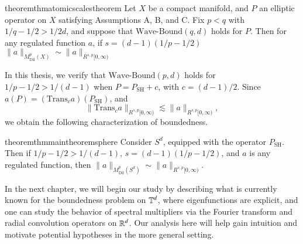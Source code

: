 \begin{restatable}{theorem}{thmatomicscalestheorem} \label{atomicscalestheorem}
  Let $X$ be a compact manifold, and $P$ an elliptic operator on $X$ satisfying Assumptions A, B, and C. Fix $p < q$ with $1/q - 1/2 > 1/2d$, and suppose that $\text{Wave-Bound}(q,d)$ holds for $P$. Then for any regulated function $a$, if $s = (d-1)(1/p - 1/2)$ $\| a \|_{M^p_{\text{Dil}}(X)} \sim \| a \|_{R^{s,p}[0,\infty)}$
\end{restatable}

In this thesis, we verify that $\text{Wave-Bound}(p,d)$ holds for $1/p - 1/2 > 1/(d-1)$ when $P = P_{\text{SH}} + c$, with $c = (d-1)/2$. Since $a(P) = (\text{Trans}_c a)(P_{\text{SH}})$, and
%
\begin{equation}
  \| \text{Trans}_c a \|_{R^{s,p}[0,\infty)} \lesssim \| a \|_{R^{s,p}[0,\infty)},
\end{equation}
% 
we obtain the following characterization of boundedness.

\begin{restatable}{theorem}{thmmaintheoremsphere} \label{maintheoremsphere}
  Consider $S^d$, equipped with the operator $P_{\text{SH}}$. Then if $1/p - 1/2 > 1/(d-1)$, $s = (d-1)(1/p - 1/2)$, and $a$ is any regulated function, then $\|a \|_{M^p_{\text{Dil}}(S^d)} \sim \| a \|_{R^{s,p}[0,\infty)}$.
\end{restatable}


In the next chapter, we will begin our study by describing what is currently known for the boundedness problem on $\operatorname{\mathbb{T}}^d$, where eigenfunctions are explicit, and one can study the behavior of spectral multipliers via the Fourier transform and radial convolution operators on $\operatorname{\mathbb{R}}^d$. Our analysis here will help gain intuition and motivate potential hypotheses in the more general setting.

